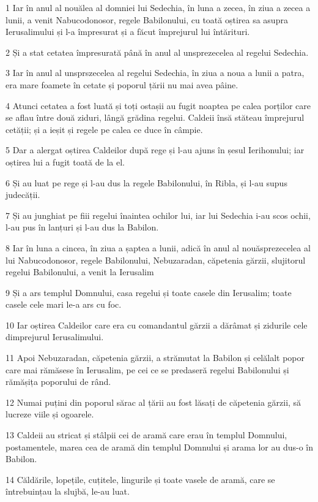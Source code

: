 \par 1 Iar în anul al nouălea al domniei lui Sedechia, în luna a zecea, în ziua a zecea a lunii, a venit Nabucodonosor, regele Babilonului, cu toată oștirea sa asupra Ierusalimului și l-a împresurat și a făcut împrejurul lui întărituri.
\par 2 Și a stat cetatea împresurată până în anul al unsprezecelea al regelui Sedechia.
\par 3 Iar în anul al unsprszecelea al regelui Sedechia, în ziua a noua a lunii a patra, era mare foamete în cetate și poporul țării nu mai avea pâine.
\par 4 Atunci cetatea a fost luată și toți ostașii au fugit noaptea pe calea porților care se aflau între două ziduri, lângă grădina regelui. Caldeii însă stăteau împrejurul cetății; și a ieșit și regele pe calea ce duce în câmpie.
\par 5 Dar a alergat oștirea Caldeilor după rege și l-au ajuns în șesul Ierihonului; iar oștirea lui a fugit toată de la el.
\par 6 Și au luat pe rege și l-au dus la regele Babilonului, în Ribla, și l-au supus judecății.
\par 7 Și au junghiat pe fiii regelui înaintea ochilor lui, iar lui Sedechia i-au scos ochii, l-au pus în lanțuri și l-au dus la Babilon.
\par 8 Iar în luna a cincea, în ziua a șaptea a lunii, adică în anul al nouăsprezecelea al lui Nabucodonosor, regele Babilonului, Nebuzaradan, căpetenia gărzii, slujitorul regelui Babilonului, a venit la Ierusalim
\par 9 Și a ars templul Domnului, casa regelui și toate casele din Ierusalim; toate casele cele mari le-a ars cu foc.
\par 10 Iar oștirea Caldeilor care era cu comandantul gărzii a dărâmat și zidurile cele dimprejurul Ierusalimului.
\par 11 Apoi Nebuzaradan, căpetenia gărzii, a strămutat la Babilon și celălalt popor care mai rămăsese în Ierusalim, pe cei ce se predaseră regelui Babilonului și rămășița poporului de rând.
\par 12 Numai puțini din poporul sărac al țării au fost lăsați de căpetenia gărzii, să lucreze viile și ogoarele.
\par 13 Caldeii au stricat și stâlpii cei de aramă care erau în templul Domnului, postamentele, marea cea de aramă din templul Domnului și arama lor au dus-o în Babilon.
\par 14 Căldările, lopețile, cuțitele, lingurile și toate vasele de aramă, care se întrebuințau la slujbă, le-au luat.

